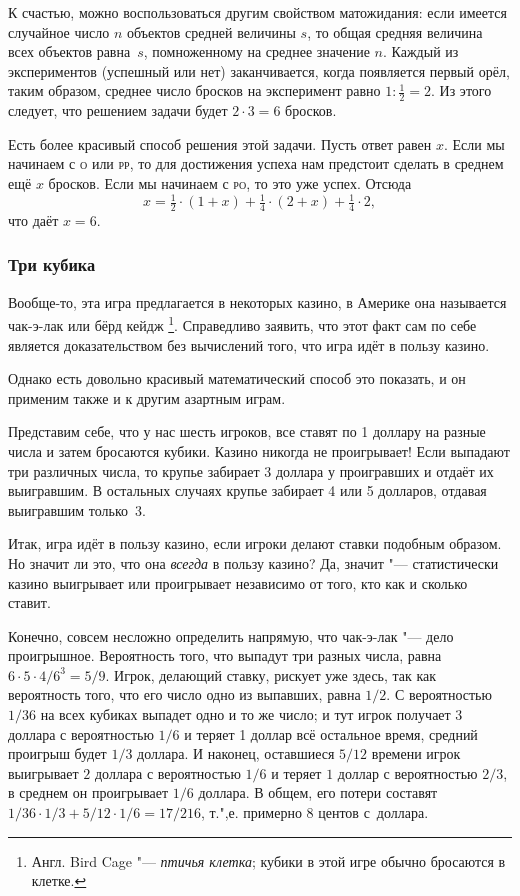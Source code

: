 \documentclass[twoside]{book}
\begin{document}
К счастью, можно воспользоваться другим свойством матожидания:
если имеется случайное число $n$ объектов средней величины $s$, то общая средняя величина всех объектов равна~$s$, помноженному на среднее значение $n$.
Каждый из экспериментов (успешный или нет) заканчивается, когда появляется первый орёл, таким образом, среднее число бросков на эксперимент равно $1:\tfrac12=2$.
Из этого следует, что
решением задачи будет $2\cdot 3=6$ бросков.\heart

Есть более красивый способ решения этой задачи.
Пусть ответ равен $x$.
Если мы начинаем с \textsc{о} или \textsc{рр}, то для достижения успеха нам предстоит сделать в среднем ещё $x$ бросков.
Если мы начинаем с \textsc{ро}, то это уже успех.
Отсюда 
\[x=\tfrac12 \cdot(1+x)+\tfrac14 \cdot(2+x)+\tfrac14 \cdot2,\]
что даёт $x=6$.

\subsubsection*{Три кубика}%

Вообще-то, эта игра предлагается в некоторых казино, в Америке она называется чак-э-лак или бёрд кейдж%
\footnote{Англ. Bird Cage "--- \emph{птичья клетка}; кубики в этой игре обычно бросаются в клетке.}. 
Справедливо заявить, что этот факт сам по себе является доказательством без вычислений того, что игра идёт в пользу казино.

Однако есть довольно красивый математический способ это показать, и он применим также и к другим азартным играм.

\medskip

Представим себе, что у нас шесть игроков, все ставят по 1 доллару на разные числа и затем бросаются кубики.
Казино никогда не проигрывает!
Если выпадают три различных числа, то крупье забирает 3 доллара у проигравших и отдаёт их выигравшим.
В остальных случаях крупье забирает 4 или 5 долларов, отдавая выигравшим только~3.
\heart

Итак, игра идёт в пользу казино, если игроки делают ставки подобным образом.
Но значит ли это, что она \emph{всегда} в пользу казино?
Да, значит "--- статистически казино выигрывает или проигрывает независимо от того, кто как и сколько ставит.

Конечно, совсем несложно определить напрямую, что чак-э-лак "--- дело проигрышное.
Вероятность того, что выпадут три разных числа, равна $6\cdot 5\cdot 4/6^3=5/9$.
Игрок, делающий ставку, рискует уже здесь, так как вероятность того, что его число одно из выпавших, равна $1/2$.
С вероятностью $1/36$ на всех кубиках выпадет одно и то же число;
и тут игрок получает $3$ доллара с вероятностью $1/6$ и теряет 1 доллар всё остальное время, средний проигрыш будет $1/3$ доллара.
И наконец, оставшиеся $5/12$ времени игрок выигрывает $2$ доллара с вероятностью $1/6$ и теряет $1$ доллар с вероятностью $2/3$, в среднем он проигрывает $1/6$ доллара.
В общем, его потери составят $1/36 \cdot 1/3 + 5/12 \cdot 1/6 = 17/216$, т.",е. примерно $8$ центов с~доллара.
\end{document}
